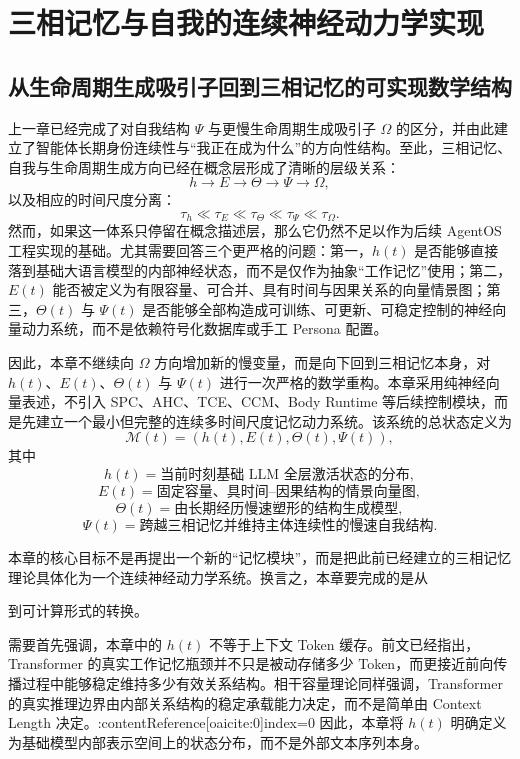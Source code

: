 \chapter{三相记忆与自我的连续神经动力学实现}
\label{chap:tri_memory_neural_dynamics}

\section{从生命周期生成吸引子回到三相记忆的可实现数学结构}

上一章已经完成了对自我结构 $\Psi$ 与更慢生命周期生成吸引子 $\Omega$ 的区分，并由此建立了智能体长期身份连续性与“我正在成为什么”的方向性结构。至此，三相记忆、自我与生命周期生成方向已经在概念层形成了清晰的层级关系：
\[
h \rightarrow E \rightarrow \Theta \rightarrow \Psi \rightarrow \Omega,
\]
以及相应的时间尺度分离：
\[
\tau_h \ll \tau_E \ll \tau_\Theta \ll \tau_\Psi \ll \tau_\Omega.
\]
然而，如果这一体系只停留在概念描述层，那么它仍然不足以作为后续 AgentOS 工程实现的基础。尤其需要回答三个更严格的问题：第一，$h(t)$ 是否能够直接落到基础大语言模型的内部神经状态，而不是仅作为抽象“工作记忆”使用；第二，$E(t)$ 能否被定义为有限容量、可合并、具有时间与因果关系的向量情景图；第三，$\Theta(t)$ 与 $\Psi(t)$ 是否能够全部构造成可训练、可更新、可稳定控制的神经向量动力系统，而不是依赖符号化数据库或手工 Persona 配置。

因此，本章不继续向 $\Omega$ 方向增加新的慢变量，而是向下回到三相记忆本身，对 $h(t)$、$E(t)$、$\Theta(t)$ 与 $\Psi(t)$ 进行一次严格的数学重构。本章采用纯神经向量表述，不引入 SPC、AHC、TCE、CCM、Body Runtime 等后续控制模块，而是先建立一个最小但完整的连续多时间尺度记忆动力系统。该系统的总状态定义为
\[
\mathcal{M}(t)
=
\left(
h(t),E(t),\Theta(t),\Psi(t)
\right),
\]
其中
\[
h(t)
=
\text{当前时刻基础 LLM 全层激活状态的分布},
\]
\[
E(t)
=
\text{固定容量、具时间--因果结构的情景向量图},
\]
\[
\Theta(t)
=
\text{由长期经历慢速塑形的结构生成模型},
\]
\[
\Psi(t)
=
\text{跨越三相记忆并维持主体连续性的慢速自我结构}.
\]

本章的核心目标不是再提出一个新的“记忆模块”，而是把此前已经建立的三相记忆理论具体化为一个连续神经动力学系统。换言之，本章要完成的是从
\begin{statementbox}
\centering
{}
\end{statementbox}
到可计算形式的转换。

需要首先强调，本章中的 $h(t)$ 不等于上下文 Token 缓存。前文已经指出，Transformer 的真实工作记忆瓶颈并不只是被动存储多少 Token，而更接近前向传播过程中能够稳定维持多少有效关系结构。相干容量理论同样强调，Transformer 的真实推理边界由内部关系结构的稳定承载能力决定，而不是简单由 Context Length 决定。:contentReference[oaicite:0]{index=0} 因此，本章将 $h(t)$ 明确定义为基础模型内部表示空间上的状态分布，而不是外部文本序列本身。

